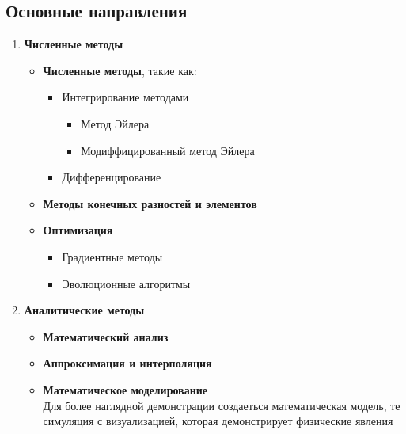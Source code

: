 \documentclass[a4paper,12pt]{article}
\begin{document}
\subsection{Основные направления}
\begin{enumerate}
    \item \textbf{Численные методы}\begin{itemize}
        \item \textbf{Численные методы}, такие как: \begin{itemize}%
            \item Интегрирование методами\begin{itemize}
                \item Метод Эйлера
                \item Модиффицированный метод Эйлера
            \end{itemize}
            \item Дифференцирование
        \end{itemize}
        \item \textbf{Методы конечных разностей и элементов}%
        \item \textbf{Оптимизация}\begin{itemize} %
            \item Градиентные методы
            \item Эволюционные алгоритмы
        \end{itemize}
    \end{itemize}
    \item \textbf{Аналитические методы}\begin{itemize}
        \item \textbf{Математический анализ}
        \item \textbf{Аппроксимация и интерполяция}
        \item \textbf{Математическое моделирование}\\ Для более наглядной демонстрации создаеться математическая модель, те симуляция с визуализацией, которая демонстрирует физические явления
    \end{itemize}
\end{enumerate}
\end{document}

